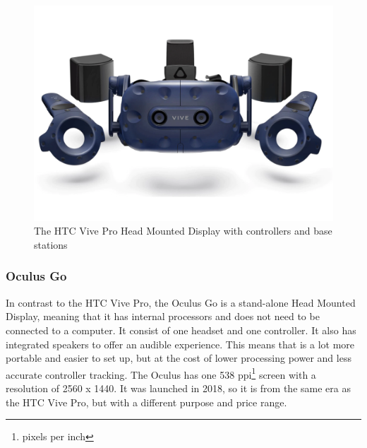                     \FloatBarrier
                    \begin{figure}[ht]
                        \centering
                        \includegraphics[width=0.9\linewidth]{figures/vive_pro.PNG}
                        \caption{The HTC Vive Pro Head Mounted Display with controllers and base stations}
                        \label{fig:vive_pro}
                    \end{figure}
                    \FloatBarrier
                    
                \subsubsection{Oculus Go}
                    In contrast to the HTC Vive Pro, the Oculus Go is a stand-alone Head Mounted Display, meaning that it has internal processors and does not need to be connected to a computer. It consist of one headset and one controller. It also has integrated speakers to offer an audible experience\cite{oculus_go}. This means that is a lot more portable and easier to set up, but at the cost of lower processing power and less accurate controller tracking. The Oculus has one 538 ppi\footnote{pixels per inch} screen with a resolution of 2560 x 1440\cite{oculus_specs}. It was launched in 2018, so it is from the same era as the HTC Vive Pro, but with a different purpose and price range.
                    
